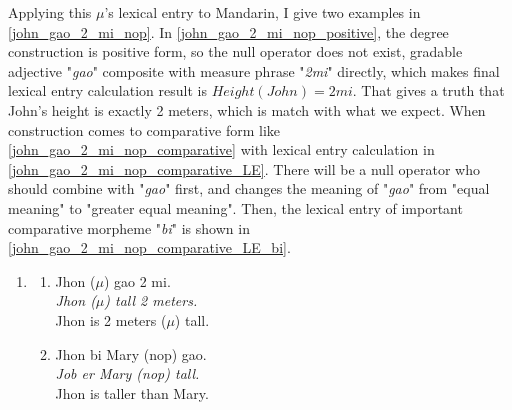 \documentclass{ctexart}
\begin{document}
Applying this $\mu$'s lexical entry to Mandarin, I give two examples in \ref{john_gao_2_mi_nop}. In \ref{john_gao_2_mi_nop_positive}, the degree construction is positive form, so the null operator does not exist, gradable adjective "\textit{gao}" composite with measure phrase "\textit{2mi}" directly, which makes final lexical entry calculation result is $Height(John)=2mi$. That gives a truth that John's height is exactly 2 meters, which is match with what we expect. When construction comes to comparative form like \ref{john_gao_2_mi_nop_comparative} with lexical entry calculation in \ref{john_gao_2_mi_nop_comparative_LE}. There will be a null operator who should combine with "\textit{gao}" first, and changes the meaning of "\textit{gao}" from "equal meaning" to "greater equal meaning". Then, the lexical entry of important comparative morpheme "\textit{bi}" is shown in \ref{john_gao_2_mi_nop_comparative_LE_bi}.

\begin{enumerate}[resume]
    \item \label{john_gao_2_mi_nop}
    
    \begin{enumerate}[ref=(\arabic{enumi}\alph*)]
        \item \label{john_gao_2_mi_nop_positive}
        Jhon ($\mu$) gao 2 mi.  \\
        \textit{Jhon ($\mu$) tall 2 meters.}    \\
        Jhon is 2 meters ($\mu$) tall.

        \item \label{john_gao_2_mi_nop_comparative}
        Jhon bi Mary (nop) gao. \\  
        \textit{Job er Mary (nop) tall.}    \\
        Jhon is taller than Mary.

    \end{enumerate}
    
\end{enumerate}
\end{document}
